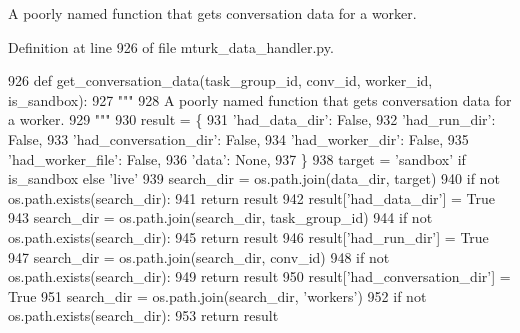\begin{DoxyVerb}A poorly named function that gets conversation data for a worker.
\end{DoxyVerb}
 

Definition at line 926 of file mturk\+\_\+data\+\_\+handler.\+py.


\begin{DoxyCode}
926     \textcolor{keyword}{def }get\_conversation\_data(task\_group\_id, conv\_id, worker\_id, is\_sandbox):
927         \textcolor{stringliteral}{"""}
928 \textcolor{stringliteral}{        A poorly named function that gets conversation data for a worker.}
929 \textcolor{stringliteral}{        """}
930         result = \{
931             \textcolor{stringliteral}{'had\_data\_dir'}: \textcolor{keyword}{False},
932             \textcolor{stringliteral}{'had\_run\_dir'}: \textcolor{keyword}{False},
933             \textcolor{stringliteral}{'had\_conversation\_dir'}: \textcolor{keyword}{False},
934             \textcolor{stringliteral}{'had\_worker\_dir'}: \textcolor{keyword}{False},
935             \textcolor{stringliteral}{'had\_worker\_file'}: \textcolor{keyword}{False},
936             \textcolor{stringliteral}{'data'}: \textcolor{keywordtype}{None},
937         \}
938         target = \textcolor{stringliteral}{'sandbox'} \textcolor{keywordflow}{if} is\_sandbox \textcolor{keywordflow}{else} \textcolor{stringliteral}{'live'}
939         search\_dir = os.path.join(data\_dir, target)
940         \textcolor{keywordflow}{if} \textcolor{keywordflow}{not} os.path.exists(search\_dir):
941             \textcolor{keywordflow}{return} result
942         result[\textcolor{stringliteral}{'had\_data\_dir'}] = \textcolor{keyword}{True}
943         search\_dir = os.path.join(search\_dir, task\_group\_id)
944         \textcolor{keywordflow}{if} \textcolor{keywordflow}{not} os.path.exists(search\_dir):
945             \textcolor{keywordflow}{return} result
946         result[\textcolor{stringliteral}{'had\_run\_dir'}] = \textcolor{keyword}{True}
947         search\_dir = os.path.join(search\_dir, conv\_id)
948         \textcolor{keywordflow}{if} \textcolor{keywordflow}{not} os.path.exists(search\_dir):
949             \textcolor{keywordflow}{return} result
950         result[\textcolor{stringliteral}{'had\_conversation\_dir'}] = \textcolor{keyword}{True}
951         search\_dir = os.path.join(search\_dir, \textcolor{stringliteral}{'workers'})
952         \textcolor{keywordflow}{if} \textcolor{keywordflow}{not} os.path.exists(search\_dir):
953             \textcolor{keywordflow}{return} result

\end{DoxyCode}
